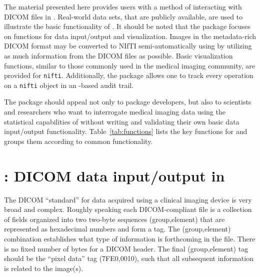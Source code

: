 \documentclass[article,nojss,shortnames]{jss}
\begin{document}
The material presented here provides users with a method of
interacting with DICOM files in  \citep{R}.  Real-world
data sets, that are publicly available, are used to illustrate the
basic functionality of  \citep{whi-sch-tho:JSS}.  It
should be noted that the package focuses on functions for data
input/output and visualization.  Images in the metadata-rich DICOM
format may be converted to NIfTI semi-automatically using
 by utilizing as much information from the DICOM files
as possible.  Basic visualization functions, similar to those commonly
used in the medical imaging community, are provided for
\texttt{nifti}.  Additionally, the  package allows one
to track every operation on a \texttt{nifti} object in an
-based audit trail.

The  package should appeal not only to 
package developers, but also to scientists and researchers who want to
interrogate medical imaging data using the statistical capabilities of
 without writing and validating their own basic data
input/output functionality.  Table~\ref{tab:functions} lists the key
functions for  and groups them according to common
functionality.

\section[oro.dicom: DICOM data input/output in R]{: DICOM data input/output in }

The DICOM ``standard'' for data acquired using a clinical imaging
device is very broad and complex.  Roughly speaking each
DICOM-compliant file is a collection of fields organized into two
two-byte sequences (group,element) that are represented as hexadecimal
numbers and form a tag.  The (group,element) combination establishes
what type of information is forthcoming in the file.  There is no
fixed number of bytes for a DICOM header.  The final (group,element)
tag should be the ``pixel data'' tag (7FE0,0010), such that all
subsequent information is related to the image(s).
\end{document}
